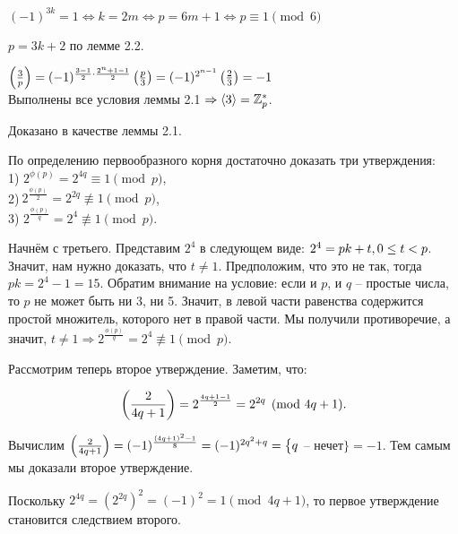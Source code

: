 $(-1)^{3k} = 1 \Leftrightarrow k = 2m \Leftrightarrow p = 6m + 1 \Leftrightarrow p \equiv 1 \pmod 6$


$p = 3k + 2$ по лемме 2.2. 

$ \left( \frac{3}{p} \right) = (-1)^{\frac{3-1}{2} \cdot \frac{2^n + 1 -1}{2}} \left( \frac{p}{3} \right) = (-1)^{2^{n - 1}} \left( \frac{2}{3} \right) = -1$ \\

Выполнены все условия леммы 2.1 $\Rightarrow \langle 3 \rangle = \mathbb{Z}^*_p$.


Доказано в качестве леммы 2.1.


По определению первообразного корня достаточно доказать три утверждения: \\ 1) $2^{\phi(p)} = 2^{4q} \equiv 1 \pmod p$,\\ 2)$\ 2^{\frac{\phi(p)}{2}} =  2^{2q} \not \equiv 1 \pmod p$, \\ 3) $2^{\frac{\phi(p)}{q}} =  2^{4} \not \equiv 1 \pmod p$.

Начнём с третьего. Представим $2^4$ в следующем виде: $2^4 = pk + t, \\ 0 \le t < p$. Значит, нам нужно доказать, что $t \ne 1$. Предположим, что это не так, тогда $pk = 2^4 - 1 = 15$. Обратим внимание на условие: если и $p$, и $q$ -- простые числа, то $p$ не может быть ни 3, ни 5. Значит, в левой части равенства содержится простой множитель, которого нет в правой части. Мы получили противоречие, а значит, $t \ne 1 \Rightarrow 2^{\frac{\phi(p)}{q}} =  2^{4} \not \equiv 1 \pmod p$.

Рассмотрим теперь второе утверждение. Заметим, что:

$$\left( \frac{2}{4q + 1} \right) = 2 ^ {\frac{4q + 1 - 1}{2}} = 2 ^ {2q} \pmod {4q + 1}.$$

Вычислим $\left( \frac{2}{4q+1} \right) = (-1) ^ {\frac{(4q+1)^2 - 1}{8}} = (-1)^{2q^2 + q} = \big\{q$ -- нечет$\big\} = -1$. Тем самым мы доказали второе утверждение.

Поскольку $2^{4q} = (2^{2q})^2 = (-1)^2 = 1 \pmod {4q+1}$, то первое утверждение становится следствием второго.


